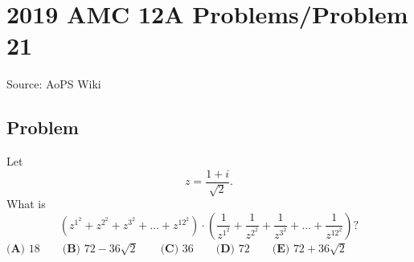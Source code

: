 \documentclass[12pt]{article}
\begin{document}
\section*{{2019 AMC 12A Problems/Problem 21}}
Source: AoPS Wiki

\subsection*{Problem}
Let \[z=\frac{1+i}{\sqrt{2}}.\] What is \[\left(z^{1^2}+z^{2^2}+z^{3^2}+\dots+z^{{12}^2}\right) \cdot \left(\frac{1}{z^{1^2}}+\frac{1}{z^{2^2}}+\frac{1}{z^{3^2}}+\dots+\frac{1}{z^{{12}^2}}\right)?\] $\textbf{(A) } 18 \qquad \textbf{(B) } 72-36\sqrt2 \qquad \textbf{(C) } 36 \qquad \textbf{(D) } 72 \qquad \textbf{(E) } 72+36\sqrt2$
\end{document}
